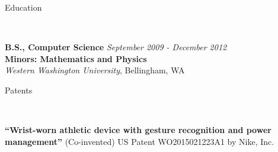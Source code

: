 \documentclass[9pt]{article}
\newenvironment{changemargin}[2]{%
  \begin{list}{}{%
    \setlength{\topsep}{0pt}%
    \setlength{\leftmargin}{#1}%
    \setlength{\rightmargin}{#2}%
    \setlength{\listparindent}{\parindent}%
    \setlength{\itemindent}{\parindent}%
    \setlength{\parsep}{\parskip}%
  }%
  \item[]}{\end{list}
}
\newcommand{\lineover}{
    \begin{changemargin}{-0.05in}{-0.05in}
        \vspace*{-8pt}
        \hrulefill \\
        \vspace*{-2pt}
    \end{changemargin}
}
\newcommand{\header}[1]{
    \begin{changemargin}{-0.5in}{-0.5in}
        {\large #1}\\
        \lineover
    \end{changemargin}
}
\newenvironment{body} {
    \vspace*{-16pt}
    \begin{changemargin}{-0.20in}{-0.5in}
  }
    {\end{changemargin}
}
\begin{document}
\vspace*{11pt}
\smallskip


\header{Education}

\begin{body}
    \vspace{14pt}

    \textbf{B.S., Computer Science}{} \hfill \emph{September 2009 - December 2012}{} \\
    \textbf{Minors: Mathematics and Physics}\\
    \emph{Western Washington University}, Bellingham, WA{} \\
    \medskip


\end{body}

\smallskip



\header{Patents}
\begin{body}
    \vspace{14pt}
    \textbf{``Wrist-worn athletic device with gesture recognition and power management''} (Co-invented) US Patent WO2015021223A1 by Nike, Inc.
\end{body}

\smallskip

\newpage

\end{document}
